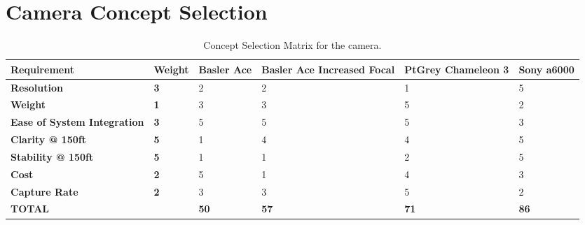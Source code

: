 \documentclass[]{auvsi_doc}
\begin{document}
\begin{AUVSITitlePage}
\begin{artifacttable}
\end{artifacttable}
\end{AUVSITitlePage}

\section{Camera Concept Selection}
\begin{table}[H]
\centering
\caption{Concept Selection Matrix for the camera.}
\begin{tabular}{|p{3.45cm}|p{1.5cm}|p{1.55cm}|p{2.5cm}|p{2.5cm}|p{2.0cm}|}
\hline
\rowcolor[HTML]{C0C0C0}
{\color[HTML]{000000} \textbf{Requirement}} & {\color[HTML]{000000} \textbf{Weight}} & {\color[HTML]{000000} \textbf{Basler Ace}} & {\color[HTML]{000000} \textbf{Basler Ace Increased Focal}} & {\color[HTML]{000000} \textbf{PtGrey Chameleon 3}} & {\color[HTML]{000000} \textbf{Sony a6000}}\\ \hline
{\color[HTML]{000000} \textbf{Resolution}}	& \textbf{3}	& 2	& 2	& 1	& 5 \\ \hline
{\color[HTML]{000000} \textbf{Weight}}	&	\textbf{1}	&	3 &	3 	& 	5 	&	2 \\ \hline
{\color[HTML]{000000} \textbf{Ease of System Integration}}	&	\textbf{3} 	&	5 	& 	5 	& 	5 	& 	3 \\ \hline
{\color[HTML]{000000} \textbf{Clarity @ 150ft}}	&	\textbf{5} 	&	1 	& 	4	&	4	&	5 \\ \hline
{\color[HTML]{000000} \textbf{Stability @ 150ft}}	&	\textbf{5} 	&	1 	&	1 	&	2	&	5 \\ \hline
{\color[HTML]{000000} \textbf{Cost}}	&	\textbf{2} 	&	5 	&	1 	&	4	&	3 \\ \hline
{\color[HTML]{000000} \textbf{Capture Rate}}	&	\textbf{2} 	&	3 	&	3 	&	5 	&	2 \\ \hline
\rowcolor[HTML]{C0C0C0}
{\color[HTML]{000000} \textbf{TOTAL}}	&	&	{\color[HTML]{000000} \textbf{50}}	&	{\color[HTML]{000000} \textbf{57}}	&	{\color[HTML]{000000} \textbf{71}}	&	{\color[HTML]{000000} \textbf{86}} \\ \hline
\end{tabular}
\end{table}
\end{document}

